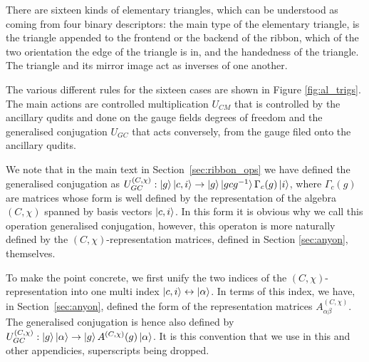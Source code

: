 \documentclass[two column]{article}
\begin{document}
There are sixteen kinds of elementary triangles, which can be understood as coming from four binary descriptors: the main type of the elementary triangle, is the triangle appended to the frontend or the backend of the ribbon, which of the two orientation the edge of the triangle is in, and the handedness of the triangle. The triangle and its mirror image act as inverses of one another.

The various different rules for the sixteen cases are shown in Figure \ref{fig:al_trigs}. The main actions are controlled multiplication $U_{CM}$ that is controlled by the ancillary qudits and done on the gauge fields degrees of freedom and the generalised conjugation $U_{GC}$ that acts conversely, from the gauge filed onto the ancillary qudits.

We note that in the main text in Section~\ref{sec:ribbon_ops} we have defined the generalised conjugation as $U_{GC}^{(C, \chi)}: \ket{g}\ket{c,i} \rightarrow \ket{g}\ket{g c g^{-1}}\Gamma_c(g)\ket{i}$, where $\Gamma_c(g)$ are matrices whose form is well defined by the representation of the algebra $(C, \chi)$ spanned by basis vectors $\ket{c,i}$. In this form it is obvious why we call this operation generalised conjugation, however, this operaton is more naturally defined by the $(C, \chi)$-representation matrices, defined in Section \ref{sec:anyon}, themselves. 

To make the point concrete, we first unify the two indices of the $(C, \chi)$-representation into one multi index $\ket{c, i} \leftrightarrow \ket{\alpha}$. In terms of this index, we have, in Section~\ref{sec:anyon}, defined the form of the representation matrices $A^{(C,\chi)}_{\alpha\beta}$. The generalised conjugation is hence also defined by $U_{GC}^{(C, \chi)}: \ket{g}\ket{\alpha} \rightarrow \ket{g}A^{(C, \chi)}(g)\ket{\alpha}$. It is this convention that we use in this and other appendicies, superscripts being dropped.
\end{document}
